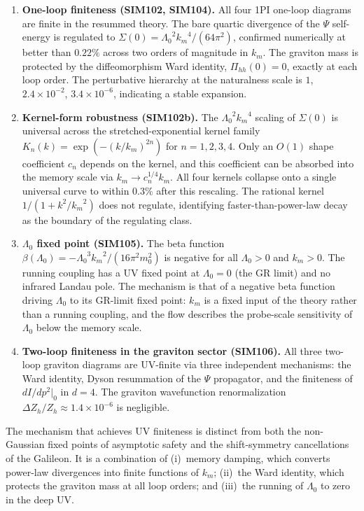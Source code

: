 \documentclass[12pt,a4paper]{article}
\newcommand{\Lz}{{\Lambda_0}}
\newcommand{\km}{{k_m}}
\begin{document}
\begin{enumerate}
  \item \textbf{One-loop finiteness (SIM102, SIM104).} All four 1PI one-loop
    diagrams are finite in the resummed theory. The bare quartic divergence
    of the $\Psi$ self-energy is regulated to $\Sigma(0) = \Lz^2\km^4/(64\pi^2)$,
    confirmed numerically at better than $0.22\%$ across two orders of magnitude
    in $\km$. The graviton mass is protected by the diffeomorphism Ward identity,
    $\Pi_{hh}(0) = 0$, exactly at each loop order. The perturbative hierarchy at
    the naturalness scale is $1$, $2.4\times10^{-2}$, $3.4\times10^{-6}$,
    indicating a stable expansion.

  \item \textbf{Kernel-form robustness (SIM102b).} The $\Lz^2\km^4$ scaling of
    $\Sigma(0)$ is universal across the stretched-exponential kernel family
    $K_n(k) = \exp(-(k/\km)^{2n})$ for $n = 1, 2, 3, 4$. Only an $O(1)$ shape
    coefficient $c_n$ depends on the kernel, and this coefficient can be absorbed
    into the memory scale via $\km \to c_n^{1/4}\km$. All four kernels collapse
    onto a single universal curve to within $0.3\%$ after this rescaling. The
    rational kernel $1/(1+k^2/\km^2)$ does not regulate, identifying
    faster-than-power-law decay as the boundary of the regulating class.

  \item \textbf{$\Lz$ fixed point (SIM105).} The beta function
    $\beta(\Lz) = -\Lz^3\km^2/(16\pi^2 m_0^2)$ is negative for all $\Lz > 0$
    and $\km > 0$. The running coupling has a UV fixed point at $\Lz = 0$ (the
    GR limit) and no infrared Landau pole. The mechanism is that of a negative
    beta function driving $\Lz$ to its GR-limit fixed point: $\km$ is a fixed
    input of the theory rather than a running coupling, and the flow describes
    the probe-scale sensitivity of $\Lz$ below the memory scale.

  \item \textbf{Two-loop finiteness in the graviton sector (SIM106).} All
    three two-loop graviton diagrams are UV-finite via three independent
    mechanisms: the Ward identity, Dyson resummation of the $\Psi$ propagator,
    and the finiteness of $dI/dp^2|_0$ in $d=4$. The graviton wavefunction
    renormalization $\Delta Z_h/Z_h \approx 1.4\times10^{-6}$ is negligible.
\end{enumerate}

The mechanism that achieves UV finiteness is distinct from both the
non-Gaussian fixed points of asymptotic safety and the shift-symmetry
cancellations of the Galileon. It is a combination of (i)~memory damping,
which converts power-law divergences into finite functions of $\km$;
(ii)~the Ward identity, which protects the graviton mass at all loop orders;
and (iii)~the running of $\Lz$ to zero in the deep UV.
\end{document}
